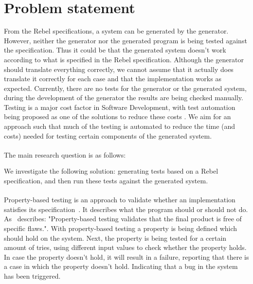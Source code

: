 \section{Problem statement}
From the Rebel specifications, a system can be generated by the generator. However, neither the generator nor the generated program is being tested against the specification. Thus it could be that the generated system doesn't work according to what is specified in the Rebel specification. Although the generator should translate everything correctly, we cannot assume that it actually does translate it correctly for each case and that the implementation works as expected. Currently, there are no tests for the generator or the generated system, during the development of the generator the results are being checked manually. Testing is a major cost factor in Software Development, with test automation being proposed as one of the solutions to reduce these costs \cite{ramler2006economic}. We aim for an approach such that much of the testing is automated to reduce the time (and costs) needed for testing certain components of the generated system.\\
\\
The main research question is as follows:
\begin{quote}
  \rqMain
\end{quote}
We investigate the following solution: generating tests based on a Rebel specification, and then run these tests against the generated system.\\
\\
Property-based testing is an approach to validate whether an implementation satisfies its specification~\cite{fink1997property}. It describes what the program should or should not do. As~\cite{fink1997property} describes: "Property-based testing validates that the final product is free of specific flaws.". With property-based testing a property is being defined which should hold on the system. Next, the property is being tested for a certain amount of tries, using different input values to check whether the property holds. In case the property doesn't hold, it will result in a failure, reporting that there is a case in which the property doesn't hold. Indicating that a bug in the system has been triggered.\\
\\
